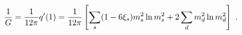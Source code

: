 \begin{equation}\label{1.4}
{1 \over G}={1 \over 12\pi}q'(1)=
{1 \over 12\pi}\left[ \sum_s (1-6\xi_s)m_s^2\ln m_s^2 +2\sum_d
m_d^2\ln m_d^2\right]~.
\end{equation}


